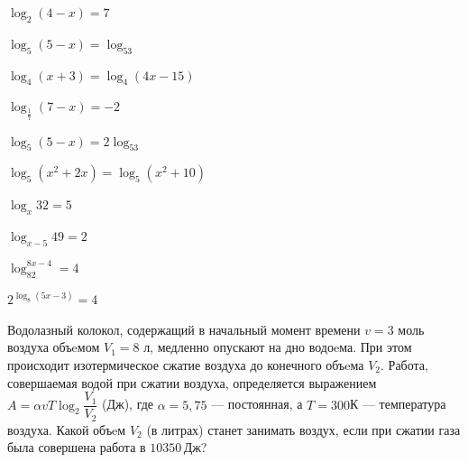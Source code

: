 \begin{class}[number=7]
\begin{listofex}
\begin{enumcols}[itemcolumns=2]
	\item \( \log_2(4-x)=7 \)
	\item \( \log_5(5-x)=\log_53 \)
	\item \( \log_4(x+3)=\log_4(4x-15) \)
	\item \( \log_{\frac{1}{7}}(7-x)=-2 \)
	\item \( \log_5(5-x)=2\log_53 \)
	\item \( \log_5(x^2+2x)=\log_5(x^2+10) \)
	\item \( \log_x32=5 \)	
	\item \( \log_{x-5}49=2 \)
	\item \( \log_82^{8x-4}=4 \)
	\item \( 2^{\log_8(5x-3)}=4 \)
	\end{enumcols}
	\item {}
	\item Водолазный колокол, содержащий в начальный момент времени  \( v = 3 \) моль воздуха объeмом \( V_1=8 \) л, медленно опускают на дно водоeма. При этом происходит изотермическое сжатие воздуха до конечного объeма \( V_2 \). Работа, совершаемая водой при сжатии воздуха, определяется выражением \( A=\alpha vT\log_2\dfrac{V_1}{V_2} \) (Дж), где \(  \alpha=5,75 \) --- постоянная, а \( T = 300 \)К --- температура воздуха. Какой объeм \( V_2 \) (в литрах) станет занимать воздух, если при сжатии газа была совершена работа в \( 10 350 \) Дж?	
	\end{listofex}
\end{class}
%
